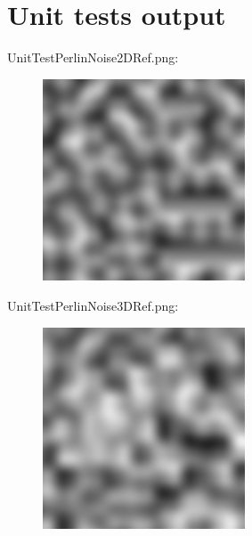 \begin{scriptsize}
\begin{ttfamily}

\end{ttfamily}
\end{scriptsize}

\section{Unit tests output}

\begin{scriptsize}
\begin{ttfamily}

\end{ttfamily}
\end{scriptsize}

UnitTestPerlinNoise2DRef.png:\\
\begin{center}
\begin{figure}[H]
\centering\includegraphics[width=6cm]{./UnitTestPerlinNoise2DRef.png}\\
\end{figure}
\end{center}

UnitTestPerlinNoise3DRef.png:\\
\begin{center}
\begin{figure}[H]
\centering\includegraphics[width=6cm]{./UnitTestPerlinNoise3DRef.png}\\
\end{figure}
\end{center}

